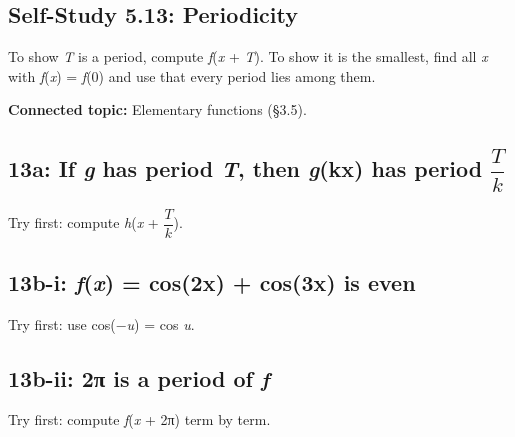 \documentclass[11pt]{article}
\begin{document}
\begin{keepsection}
\section{Self-Study 5.13: Periodicity}

To show \textit{T} is a period, compute \textit{f}(\textit{x} + \textit{T}). To show it is the smallest, find all \textit{x} with \textit{f}(\textit{x}) = \textit{f}(0) and use that every period lies among them.

\textbf{Connected topic:} Elementary functions (§3.5).

\begin{keepsection}
\subsection{13a: If \textit{g} has period \textit{T}, then \textit{g}(kx) has period {\small\ensuremath{\dfrac{{T}}{{k}}}}}

Try first: compute \textit{h}(\textit{x} + {\small\ensuremath{\dfrac{{T}}{{k}}}}).

\end{keepsection}

\begin{keepsection}
\subsection{13b-i: \textit{f}(\textit{x}) = cos(2x) + cos(3x) is even}

Try first: use cos(\ensuremath{-}\textit{u}) = cos \textit{u}.

\end{keepsection}

\begin{keepsection}
\subsection{13b-ii: 2π is a period of \textit{f}}

Try first: compute \textit{f}(\textit{x} + 2π) term by term.


\end{keepsection}
\end{keepsection}
\end{document}
